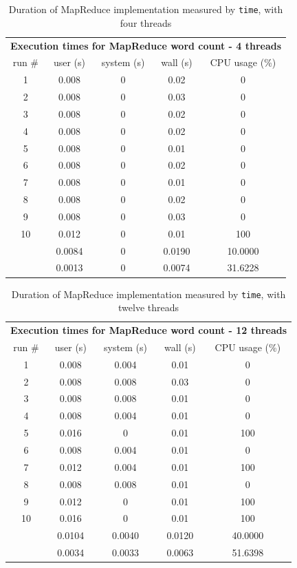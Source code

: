 \documentclass[12pt, letterpaper]{article}
\begin{document}
	\begin{table}[h]
	\centering
	\begin{tabular}{ccccc}
	\multicolumn{5}{c}{\cellcolor[HTML]{FFFFC7}\textbf{Execution times for MapReduce word count - 4 threads}} \\
	\cellcolor[HTML]{EFEFEF}run \# & \cellcolor[HTML]{EFEFEF}user (s) & \cellcolor[HTML]{EFEFEF}system (s) & 				\cellcolor[HTML]{EFEFEF}wall (s) & \cellcolor[HTML]{EFEFEF}CPU usage (\%) \\
	1 & 0.008 & 0 & 0.02 & 0 \\
	2 & 0.008 & 0 & 0.03 & 0 \\
	3 & 0.008 & 0 & 0.02 & 0 \\
	4 & 0.008 & 0 & 0.02 & 0 \\
	5 & 0.008 & 0 & 0.01 & 0 \\
	6 & 0.008 & 0 & 0.02 & 0 \\
	7 & 0.008 & 0 & 0.01 & 0 \\
	8 & 0.008 & 0 & 0.02 & 0 \\
	9 & 0.008 & 0 & 0.03 & 0 \\
	10 & 0.012 & 0 & 0.01 & 100 \\
	\rowcolor[HTML]{D0F0D0} 
	\multicolumn{1}{r}{\cellcolor[HTML]{9AFF99}mean (s)} & 0.0084 & 0 & 0.0190 & 10.0000 \\
	\rowcolor[HTML]{ECF4FF} 
	\multicolumn{1}{r}{\cellcolor[HTML]{DAE8FC}std. dev. (s)} & 0.0013 & 0 & 0.0074 & 31.6228
	\end{tabular}
	\caption{Duration of MapReduce implementation measured by \texttt{time}, with four threads}
	\end{table}

	\begin{table}[h]
	\centering
	\begin{tabular}{ccccc}
	\multicolumn{5}{c}{\cellcolor[HTML]{FFFFC7}\textbf{Execution times for MapReduce word count - 12 threads}} \\
	\rowcolor[HTML]{EFEFEF} 
	run \# & user (s) & system (s) & wall (s) & CPU usage (\%) \\
	1 & 0.008 & 0.004 & 0.01 & 0 \\
	2 & 0.008 & 0.008 & 0.03 & 0 \\
	3 & 0.008 & 0.008 & 0.01 & 0 \\
	4 & 0.008 & 0.004 & 0.01 & 0 \\
	5 & 0.016 & 0 & 0.01 & 100 \\
	6 & 0.008 & 0.004 & 0.01 & 0 \\
	7 & 0.012 & 0.004 & 0.01 & 100 \\
	8 & 0.008 & 0.008 & 0.01 & 0 \\
	9 & 0.012 & 0 & 0.01 & 100 \\
	10 & 0.016 & 0 & 0.01 & 100 \\
	\rowcolor[HTML]{D0F0D0} 
	\multicolumn{1}{r}{\cellcolor[HTML]{9AFF99}mean (s)} & 0.0104 & 0.0040 & 0.0120 & 40.0000 \\
	\rowcolor[HTML]{ECF4FF} 
	\multicolumn{1}{r}{\cellcolor[HTML]{DAE8FC}std. dev. (s)} & 0.0034 & 0.0033 & 0.0063 & 51.6398
	\end{tabular}
	\caption{Duration of MapReduce implementation measured by \texttt{time}, with twelve threads}
	\end{table}
\end{document}

